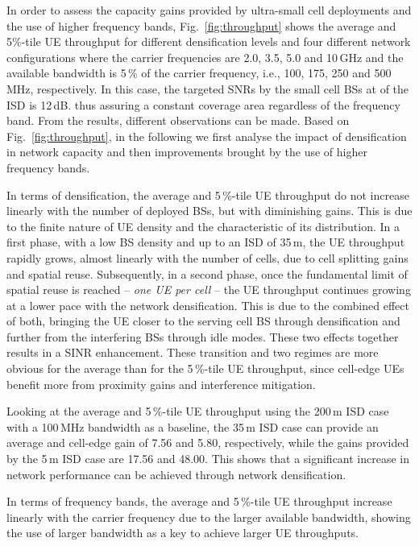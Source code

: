 \documentclass{IEEEtran}
\begin{document}
In order to assess the capacity gains provided by ultra-small cell deployments and the use of higher frequency bands,
Fig.~\ref{fig:throughput} shows the average and 5\%-tile UE throughput for different densification levels and four different network configurations
where the carrier frequencies are 2.0, 3.5, 5.0 and 10\,GHz and the available bandwidth is 5\,\% of the carrier frequency,
i.e., 100, 175, 250 and 500\,MHz, respectively.
In this case, the targeted \acp{SNR} by the small cell \acp{BS} at  of the \ac{ISD} is 12\,dB.
thus assuring a constant coverage area regardless of the frequency band.
From the results,
different observations can be made.
Based on Fig.~\ref{fig:throughput}, 
in the following we first analyse the impact of densification in network capacity and then improvements brought by the use of higher frequency bands.


In terms  of densification,
the average and 5\,\%-tile \ac{UE} throughput do not increase linearly with the number of deployed \acp{BS},
but with diminishing gains.
This is due to the finite nature of \ac{UE} density and the characteristic of its distribution.
In a first phase,
with a low \ac{BS} density and up to an \ac{ISD} of 35\,m,
the UE throughput rapidly grows, almost linearly with the number of cells,
due to cell splitting gains and spatial reuse.
Subsequently, in a second phase,
once the fundamental limit of spatial reuse is reached -- \emph{one \ac{UE} per cell} --
the UE throughput continues growing at a lower pace with the network densification.
This is due to the combined effect of both,
bringing the UE closer to the serving cell BS through densification and further from the interfering BSs through idle modes.
These two effects together results in a \ac{SINR} enhancement.
These transition and two regimes are more obvious for the average than for the 5\,\%-tile UE throughput,
since cell-edge \acp{UE} benefit more from proximity gains and interference mitigation.


Looking at the average and 5\,\%-tile \ac{UE} throughput using the 200\,m \ac{ISD} case with a 100\,MHz bandwidth as a baseline,
the 35\,m \ac{ISD} case can provide an average and cell-edge gain of 7.56 and 5.80, respectively,
while the gains provided by the 5\,m \ac{ISD} case are 17.56 and 48.00.
This shows that a significant increase in network performance can be achieved through network densification.

In terms of frequency bands,
the average and 5\,\%-tile \ac{UE} throughput increase linearly with the carrier frequency due to the larger available bandwidth,
showing the use of larger bandwidth as a key to achieve larger \ac{UE} throughputs.
\end{document}
